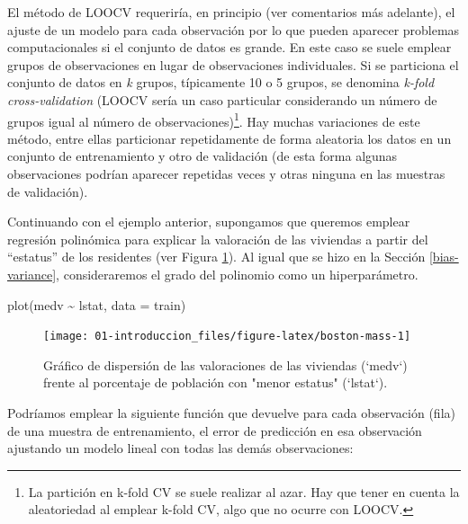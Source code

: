 \documentclass[
  spanish,
]{book}
\newenvironment{Shaded}{\begin{snugshade}}{\end{snugshade}}
\newcommand{\AttributeTok}[1]{\textcolor[rgb]{0.77,0.63,0.00}{#1}}
\newcommand{\FunctionTok}[1]{\textcolor[rgb]{0.00,0.00,0.00}{#1}}
\newcommand{\NormalTok}[1]{#1}
\newcommand{\SpecialCharTok}[1]{\textcolor[rgb]{0.00,0.00,0.00}{#1}}
\theoremstyle{break}
\theoremstyle{definition}
\theoremstyle{definition}
\theoremstyle{definition}
\theoremstyle{definition}
\theoremstyle{remark}
\begin{document}
El método de LOOCV requeriría, en principio (ver comentarios más adelante), el ajuste de un modelo para cada observación por lo que pueden aparecer problemas computacionales si el conjunto de datos es grande.
En este caso se suele emplear grupos de observaciones en lugar de observaciones individuales.
Si se particiona el conjunto de datos en \emph{k} grupos, típicamente 10 o 5 grupos, se denomina \emph{k-fold cross-validation} (LOOCV sería un caso particular considerando un número de grupos igual al número de observaciones)\footnote{La partición en k-fold CV se suele realizar al azar. Hay que tener en cuenta la aleatoriedad al emplear k-fold CV, algo que no ocurre con LOOCV.}.
Hay muchas variaciones de este método, entre ellas particionar repetidamente de forma aleatoria los datos en un conjunto de entrenamiento y otro de validación (de esta forma algunas observaciones podrían aparecer repetidas veces y otras ninguna en las muestras de validación).

Continuando con el ejemplo anterior, supongamos que queremos emplear regresión polinómica para explicar la valoración de las viviendas a partir del ``estatus'' de los residentes (ver Figura \ref{fig:boston-mass}).
Al igual que se hizo en la Sección \ref{bias-variance}, consideraremos el grado del polinomio como un hiperparámetro.

\begin{Shaded}
\begin{Highlighting}[]
\FunctionTok{plot}\NormalTok{(medv }\SpecialCharTok{\textasciitilde{}}\NormalTok{ lstat, }\AttributeTok{data =}\NormalTok{ train)}
\end{Highlighting}
\end{Shaded}

\begin{figure}[!htb]

{\centering \texttt{[image: 01-introduccion\_files/figure-latex/boston-mass-1]} 

}

\caption{Gráfico de dispersión de las valoraciones de las viviendas (`medv`) frente al porcentaje de población con "menor estatus" (`lstat`).}\label{fig:boston-mass}
\end{figure}

Podríamos emplear la siguiente función que devuelve para cada observación (fila) de una muestra de entrenamiento, el error de predicción en esa observación ajustando un modelo lineal con todas las demás observaciones:
\end{document}
